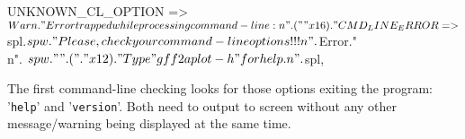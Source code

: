 \documentclass[11pt]{article}
\def\nwendcode{\endtrivlist \endgroup} %
\let\nwdocspar=\par                    %
\begin{document}
\nwenddocs{}\endmoddef
UNKNOWN_CL_OPTION =>
  $Warn."Error trapped while processing command-line:\\n".(" "x16)."\\%
CMD_LINE_ERROR =>
  $spl.$spw." Please, check your command-line options!!!\\n".$Error."\\n".
  $spw." ".("."x12)." Type \\"gff2aplot -h\\" for help.\\n".$spl,
\nwendcode{}\nwdocspar


The first command-line checking looks for those options exiting the program: '{\tt{}help}' and '{\tt{}version}'. Both need to output to screen without any other message/warning being displayed at the same time.
\end{document}
